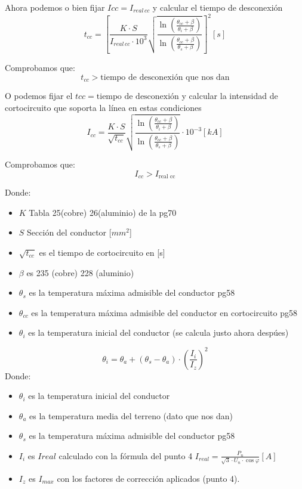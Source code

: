\documentclass[10pt,a4paper]{article}
\begin{document}
Ahora podemos o bien fijar $Icc = I_{real\, cc}$ y calcular el tiempo de desconexión 
$$
t_{c c}=\left[\frac{K \cdot S}{I_{real\,cc}\cdot 10^3} \sqrt{\frac{\ln \left(\frac{\theta_{c c}+\beta}{\theta_{i}+\beta}\right)}{\ln \left(\frac{\theta_{c c}+\beta}{\theta_{s}+\beta}\right)}}\right]^{2} [s]
$$

Comprobamos que:
$$t_{cc} > \text{tiempo de desconexión que nos dan}$$

O podemos fijar el $tcc = \text{tiempo de desconexión}$ y calcular la intensidad de cortocircuito que soporta la línea en estas condiciones
$$
I_{c c}=\frac{K \cdot S}{\sqrt{t_{c c}}} \sqrt{\frac{\ln \left(\frac{\theta_{c c}+\beta}{\theta_{i}+\beta}\right)}{\ln \left(\frac{\theta_{c c}+\beta}{\theta_{s}+\beta}\right)}} \cdot 10^{-3} [kA]
$$

Comprobamos que:
$$
I_{cc} > {I_{\text{real cc}}}
$$

Donde:
\begin{itemize}
    \item $K$ Tabla 25(cobre) 26(aluminio) de la pg70
    \item $S$ Sección del conductor [$mm^2$]
    \item $\sqrt{t_{c c}}$ es el tiempo de cortocircuito en [s]
    \item $\beta$ es 235 (cobre) 228 (aluminio)
    \item $\theta_{s}$ es la temperatura máxima admisible del conductor pg58
    \item $\theta_{cc}$ es la temperatura máxima admisible del conductor en cortocircuito pg58
    \item $\theta_{i}$ es la temperatura inicial del conductor (se calcula justo ahora despúes)
    
\end{itemize}

$$
\theta_{i}=\theta_{a}+\left(\theta_{s}-\theta_{a}\right) \cdot\left(\frac{I_{i}}{I_{z}}\right)^{2}
$$
Donde:
\begin{itemize}
    \item $\theta_{i}$ es la temperatura inicial del conductor
    \item $\theta_{a}$ es la temperatura media del terreno (dato que nos dan)
    \item $\theta_{s}$ es la temperatura máxima admisible del conductor pg58
    \item $I_i$ es $Ireal$ calculado con la fórmula del punto 4 $I_{real}=\frac{P_{n}}{\sqrt{3} \cdot U_{n} \cdot \cos \varphi} [A]$
    \item $I_z$ es $I_{max}$ con los factores de corrección aplicados (punto 4).
\end{itemize}
\end{document}
